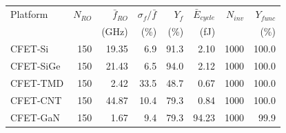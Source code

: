 \setlength{\tabcolsep}{3pt}\begin{tabular}{@{}lrrrrrrr@{}}
\hline
Platform & $N_{RO}$ & $\bar f_{RO}$ & $\sigma_f/\bar f$ & $Y_f$ & $\bar E_{cycle}$ & $N_{inv}$ & $Y_{func}$ \\
 & & (GHz) & (\%) & (\%) & (fJ) & & (\%) \\
\hline
CFET-Si & 150 & 19.35 & 6.9 & 91.3 & 2.10 & 1000 & 100.0 \\
CFET-SiGe & 150 & 21.43 & 6.5 & 94.0 & 2.12 & 1000 & 100.0 \\
CFET-TMD & 150 & 2.42 & 33.5 & 48.7 & 0.67 & 1000 & 100.0 \\
CFET-CNT & 150 & 44.87 & 10.4 & 79.3 & 0.84 & 1000 & 100.0 \\
CFET-GaN & 150 & 1.67 & 9.4 & 79.3 & 94.23 & 1000 & 99.9 \\
\hline
\end{tabular}
